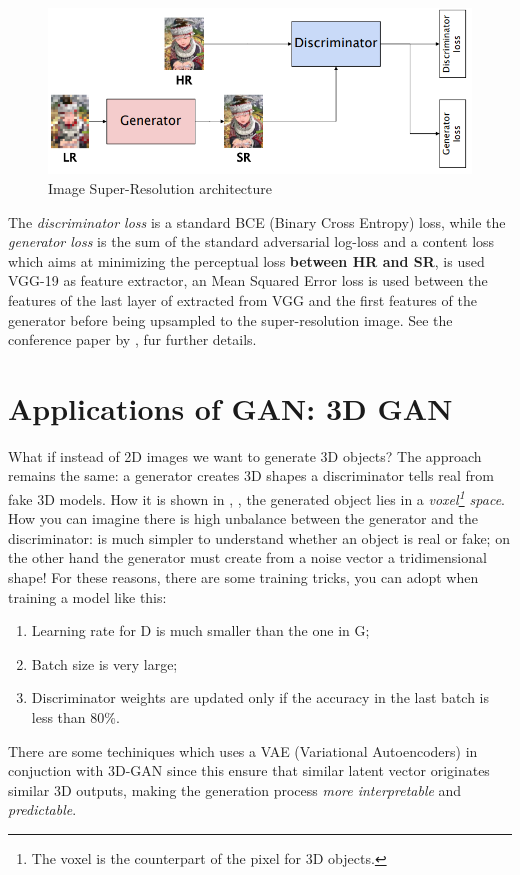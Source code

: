 \begin{figure}[h]
    \centering
    \includegraphics[scale=0.8]{img/SRResNet.png}
    \caption{Image Super-Resolution architecture}
\end{figure}

The \textit{discriminator loss} is a standard BCE (Binary Cross Entropy) loss, while the \textit{generator loss} is the sum of the standard adversarial log-loss and a \textsf{content loss} which aims at minimizing the perceptual loss \textbf{between HR and SR}, is used VGG-19 as feature extractor, an Mean Squared Error loss is used between the features of the last layer of extracted from VGG and the first features of the generator before being upsampled to the super-resolution image. See the conference paper \textit{} by \citeauthor{ledig2017photo}, \cite{ledig2017photo} fur further details.

\section{Applications of GAN: 3D GAN}
What if instead of 2D images we want to generate 3D objects? The approach remains the same: a generator creates 3D shapes a discriminator tells real from fake 3D models. How it is shown in , \cite{wu2016learning}, the generated object lies in a \textit{voxel\footnote{
    The voxel is the counterpart of the pixel for 3D objects.
} space}. How you can imagine there is high unbalance between the generator and the discriminator: is much simpler to understand whether an object is real or fake; on the other hand the generator must create from a noise vector a tridimensional shape! For these reasons, there are some training tricks, you can adopt when training a model like this:
\begin{enumerate}
    \itemsep-0.3em
    \item Learning rate for D is much smaller than the one in G; 
    \item Batch size is very large;
    \item Discriminator weights are updated only if the accuracy in the last batch is less than 80\%.
\end{enumerate}
There are some techiniques which uses a VAE (Variational  Autoencoders) in conjuction with 3D-GAN since this ensure that similar latent vector originates similar 3D outputs, making the generation process \textit{more interpretable} and \textit{predictable}.